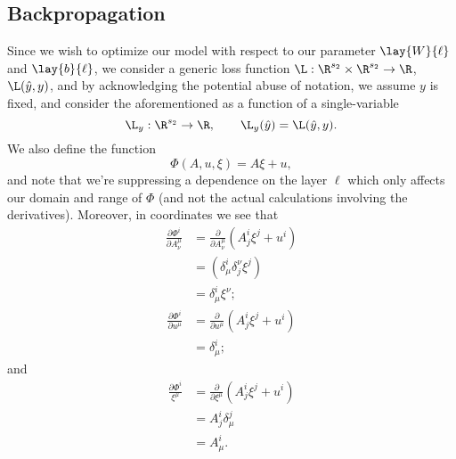 \begin{comment}
Recalling that the gradient is the transpose of the exterior derivative in Euclidean space, we then conclude that
\begin{align*}
	\nabla F&=(dF)^T\\
	&=\left(\lay{dF}{2}+\lay{dF}{1}+\lay{dF}{0}\right)^T\\
	&=\nabla\lay{F}{2}+\nabla\lay{F}{1}+\nabla\lay{F}{0},
\end{align*}
and respectively,
\begin{align*}
	\nabla\lay{F}{2}&=\left(d(\L_y)_{\lay{a}{2}}\cdot d\lay{g}{2}_{\lay{z}{2}}\cdot d\lay{\phi}{2}_{(\lay{W}{2},\lay{b}{2},\{\lay{a}{1}\})}\right)^T
\end{align*}


\end{comment}

\subsection{Backpropagation}

Since we wish to optimize our model with respect to our parameter $\lay{W}{\ell}$ and $\lay{b}{\ell}$,  we consider a generic loss function $\L:\R^{s_2}\times\R^{s_2}\to\R$, $\L(\hat{y},y)$, and by acknowledging the potential abuse of notation, we assume $y$ is fixed, and consider the aforementioned as a function of a single-variable
$$\L_y:\R^{s_2}\to\R, \qquad \L_y(\hat{y})=\L(\hat{y},y).$$
We also define the function
$$\Phi(A,u,\xi)=A\xi+u,$$
and note that we're suppressing a dependence on the layer $\ell$ which only affects our domain and range of $\Phi$ (and not the actual calculations involving the derivatives).  Moreover, in coordinates we see that
\begin{align*}
	\frac{\partial\Phi^i}{\partial A^\mu_\nu}&=\frac{\partial}{\partial A^\mu_\nu}(A^i_j\xi^j+u^i)\\
	&=(\delta^i_\mu\delta_j^\nu \xi^j)\\
	&=\delta^i_\mu \xi^\nu;
\end{align*}
\begin{align*}
	\frac{\partial\Phi^i}{\partial u^\mu}&=\frac{\partial}{\partial u^\mu}(A^i_j\xi^j+u^i)\\
	&=\delta^i_\mu;
\end{align*}
and
\begin{align*}
	\frac{\partial\Phi^i}{\xi^\mu}&=\frac{\partial}{\partial \xi^\mu}(A^i_j\xi^j+u^i)\\
	&=A^i_j\delta^j_\mu\\
	&=A^i_\mu.
\end{align*}





